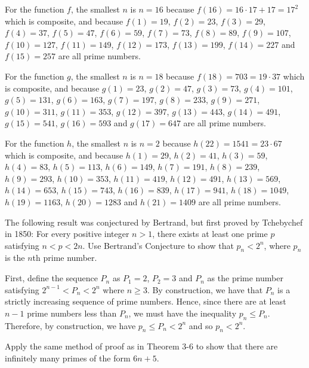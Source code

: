\begin{solution}
    For the function $f$, the smallest $n$ is $n = 16$ because $f(16) = 16\cdot 17 + 17 = 17^2$ which is composite, and because $f(1) = 19$, $f(2) = 23$, $f(3) = 29$, $f(4) = 37$, $f(5) = 47$, $f(6) = 59$, $f(7) = 73$, $f(8) = 89$, $f(9) = 107$, $f(10) = 127$, $f(11) = 149$, $f(12) = 173$, $f(13) = 199$, $f(14) = 227$ and $f(15) = 257$ are all prime numbers.
    
    For the function $g$, the smallest $n$ is $n = 18$ because $f(18) = 703 = 19\cdot 37$ which is composite, and because $g(1) = 23$, $g(2) = 47$, $g(3) = 73$, $g(4) = 101$, $g(5) = 131$, $g(6) = 163$, $g(7) = 197$, $g(8) = 233$, $g(9) = 271$, $g(10) = 311$, $g(11) = 353$, $g(12) = 397$, $g(13) = 443$, $g(14) = 491$, $g(15) = 541$, $g(16) = 593$ and $g(17) = 647$ are all prime numbers.
    
    For the function $h$, the smallest $n$ is $n = 2$ because $h(22) = 1541 = 23\cdot 67$ which is composite, and because $h(1) = 29$, $h(2) = 41$, $h(3) = 59$, $h(4) = 83$, $h(5) = 113$, $h(6) = 149$, $h(7) = 191$, $h(8) = 239$, $h(9) = 293$, $h(10) = 353$, $h(11) = 419$, $h(12) = 491$, $h(13) = 569$, $h(14) = 653$, $h(15) = 743$, $h(16) = 839$, $h(17) = 941$, $h(18) = 1049$, $h(19) = 1163$, $h(20) = 1283$ and $h(21) = 1409$ are all prime numbers.\\
\end{solution}

\begin{exercise}
    The following result was conjectured by Bertrand, but first proved by Tchebychef in 1850: For every positive integer $n > 1$, there exists at least one prime $p$ satisfying $n < p < 2n$. Use Bertrand's Conjecture to show that $p_n < 2^n$, where $p_n$ is the $n$th prime number. \\
\end{exercise}

\begin{solution}
    First, define the sequence $P_n$ as $P_1 = 2$, $P_2 = 3$ and $P_n$ as the prime number satisfying $2^{n-1} < P_n < 2^n$ where $n \geq 3$. By construction, we have that $P_n$ is a strictly increasing sequence of prime numbers. Hence, since there are at least $n-1$ prime numbers less than $P_n$, we must have the inequality $p_n \leq P_n$. Therefore, by construction, we have $p_n \leq P_n < 2^n$ and so $p_n < 2^n$. \\
\end{solution}

\begin{exercise}
    Apply the same method of proof as in Theorem 3-6 to show that there are infinitely many primes of the form $6n+5$.\\
\end{exercise}

